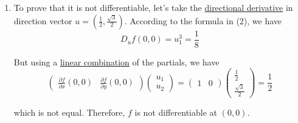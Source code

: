\begin{solution}
\begin{enumerate}
			\item To prove that it is not differentiable, let's take the \hyperref[def:directional-derivative]{directional derivative} in direction vector $u = (\frac{1}{2}, \frac{\sqrt{3}}{2})$. According to the formula in (2), we have 
				\begin{equation}
					D_u f(0, 0) = u_1^3 = \frac{1}{8}
				\end{equation} 

				But using a \hyperref[lin-def:linear-combination]{linear combination} of the partials, we have 
				\begin{equation}
					\begin{pmatrix} \frac{\partial f}{\partial x} (0, 0) & \frac{\partial f}{\partial y} (0, 0) \end{pmatrix} \begin{pmatrix} u_1 \\ u_2 \end{pmatrix} = \begin{pmatrix} 1 & 0 \end{pmatrix} \begin{pmatrix} \frac{1}{2} \\ \frac{\sqrt{3}}{2} \end{pmatrix} = \frac{1}{2}
				\end{equation}
				
				which is not equal. Therefore, $f$ is not differentiable at $(0, 0)$. 
		\end{enumerate}
	\end{solution}

